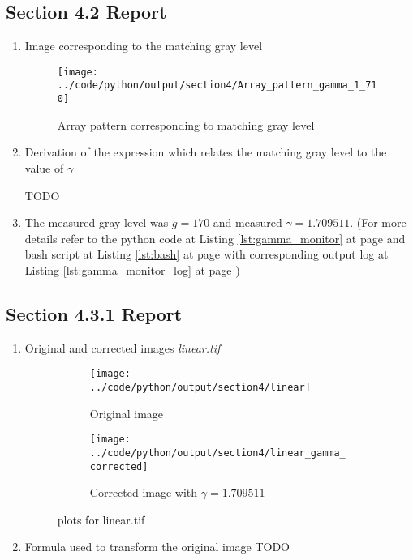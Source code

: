 \documentclass[a4paper,11pt]{article}
\newcommand{\reflst}[1]{Listing \ref{#1} at page \pageref{#1}}
\newcommand{\TODO}{{\color{red}TODO}}
\begin{document}
%
\clearpage
\vspace{2ex}
%
\subsection*{Section 4.2 Report} 
\begin{enumerate}
\item Image corresponding to the matching gray level
\begin{figure}[!hp]
 \centering
 \texttt{[image: ../code/python/output/section4/Array\_pattern\_gamma\_1\_710]}
 \caption{Array pattern corresponding to matching gray level}
\end{figure}

\item Derivation of the expression which relates the matching gray level to the value of $\gamma$

\TODO

\item The measured gray level was $g=170$ and measured $\gamma=1.709511$. (For more details refer to the python code at \reflst{lst:gamma_monitor} and bash script at \reflst{lst:bash} with corresponding output log at \reflst{lst:gamma_monitor_log})

\end{enumerate}

%
\clearpage
\vspace{2ex}
%
\subsection*{Section 4.3.1 Report} 
\begin{enumerate}
\item Original and corrected images \textit{linear.tif}
\begin{figure}[!hp]
 \centering
\begin{subfigure}{0.45\textwidth}
 \centering
 \texttt{[image: ../code/python/output/section4/linear]}
 \caption{Original image}
\end{subfigure}
\begin{subfigure}{0.45\textwidth}
 \centering
 \texttt{[image: ../code/python/output/section4/linear\_gamma\_corrected]}
 \caption{Corrected image with $\gamma=1.709511$}
\end{subfigure} 
 \caption{plots for linear.tif}
\end{figure}

\item Formula used to transform the original image
\TODO

\end{enumerate}
\end{document}
